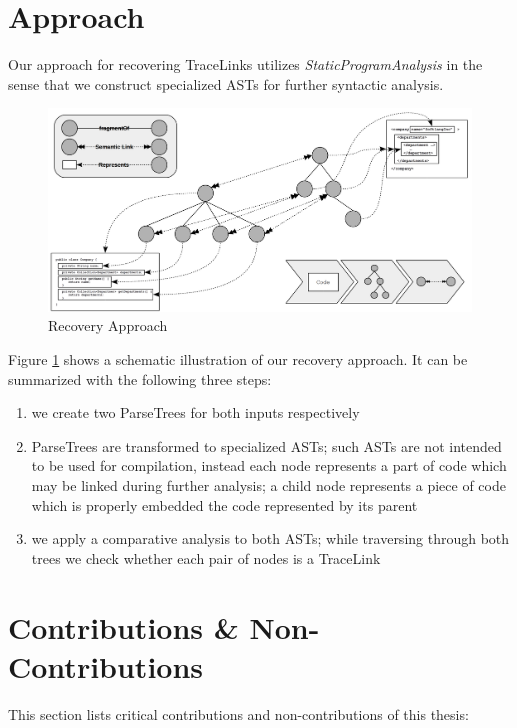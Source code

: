 \section{Approach}
\label{section:Approach}
Our approach for recovering \glspl{TraceLink} utilizes \textit{\gls{StaticProgramAnalysis}} in the sense that we construct specialized \glspl{AST} for further syntactic analysis.
\begin{figure}[h!]
\begin{center}
\includegraphics[width=\textwidth]{images/RecoveryExample.png}
\end{center}
\caption{Recovery Approach}
\label{figure:RecoveryApproach}
\end{figure}
Figure \ref{figure:RecoveryApproach} shows a schematic illustration of our recovery approach.
It can be summarized with the following three steps:
\begin{enumerate}
\item
we create two \glspl{ParseTree} for both inputs respectively
\item
\glspl{ParseTree} are transformed to specialized \glspl{AST};
such \glspl{AST} are not intended to be used for compilation, instead each node represents a part of code which may be linked during further analysis;
a child node represents a piece of code which is properly embedded the code represented by its parent
\item
we apply a comparative analysis to both \glspl{AST};
while traversing through both trees we check whether each pair of nodes is a \gls{TraceLink}
\end{enumerate}

\section{Contributions \& Non-Contributions}
\label{section:ContributionsAndNonContributions}
This section lists critical contributions and non-contributions of this thesis:

